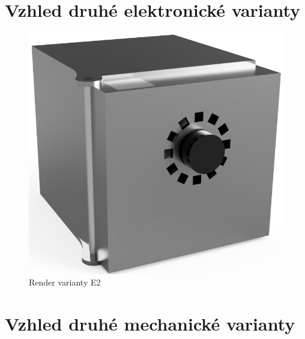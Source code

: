\section*{Vzhled druhé elektronické varianty}

\begin{figure}[htbp]
    \centering
    \includegraphics[width=\textwidth]{kapitoly/obrazky/E2/predni_render.png}
    \caption{Render varianty E2}
    \label{fig:E2-render}
\end{figure}

\section*{Vzhled druhé mechanické varianty}

